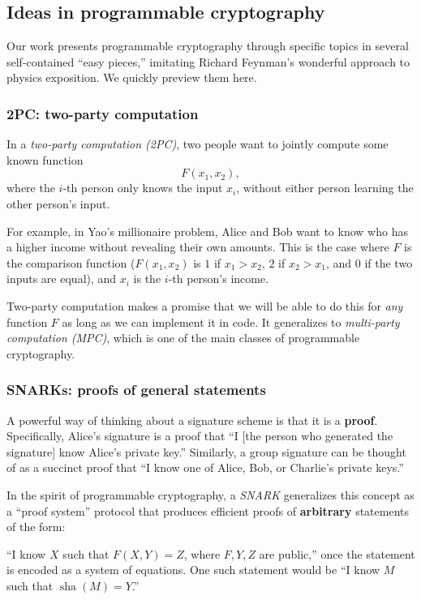 \subsection{Ideas in programmable cryptography}

Our work presents programmable cryptography through specific topics in
several self-contained ``easy pieces,'' imitating Richard Feynman's
wonderful approach to physics exposition. We quickly preview them here.

\subsubsection{2PC: two-party computation}

In a \emph{two-party computation (2PC)}, two people want to jointly
compute some known function \[F ( x_{1},x_{2}),\] where the
\(i\)-th person only knows the input \(x_{i}\), without either person
learning the other person's input.

For example, in Yao's millionaire problem, Alice and Bob want to know
who has a higher income without revealing their own amounts. This is the
case where \(F\) is the comparison function
(\(F ( x_{1},x_{2} )\) is \(1\) if \(x_{1} > x_{2}\), \(2\) if
\(x_{2} > x_{1}\), and \(0\) if the two inputs are equal), and \(x_{i}\)
is the \(i\)-th person's income.

Two-party computation makes a promise that we will be able to do this
for \emph{any} function \(F\) as long as we can implement it in code. It
generalizes to \emph{multi-party computation (MPC)}, which is one of the
main classes of programmable cryptography.

\subsubsection{SNARKs: proofs of general statements}

A powerful way of thinking about a signature scheme is that it is a
\textbf{proof}. Specifically, Alice's signature is a proof that ``I
{[}the person who generated the signature{]} know Alice's private key.''
Similarly, a group signature can be thought of as a succinct proof that
``I know one of Alice, Bob, or Charlie's private keys.''

In the spirit of programmable cryptography, a \emph{SNARK} generalizes
this concept as a ``proof system'' protocol that produces efficient
proofs of \textbf{arbitrary} statements of the form:

``I know \(X\) such that \(F(X,Y) = Z\), where \(F,Y,Z\) are public,''
once the statement is encoded as a system of equations. One such
statement would be ``I know \(M\) such that
\(\operatorname{sha}(M) = Y\).''

